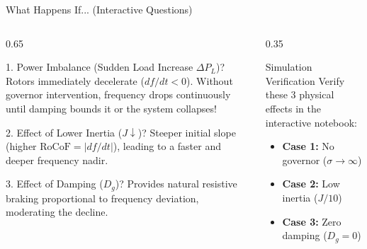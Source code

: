 \begin{frame}{What Happens If... (Interactive Questions)}
\begin{columns}[T]
\begin{column}{0.65\textwidth}
    \footnotesize
    \begin{block}{1. Power Imbalance (Sudden Load Increase $\Delta P_L$)?}
    \scriptsize
    Rotors immediately decelerate ($df/dt < 0$). Without governor intervention, frequency drops continuously until damping bounds it or the system collapses!
    \end{block}
    \begin{block}{2. Effect of Lower Inertia ($J \downarrow$)?}
    \scriptsize
    Steeper initial slope (higher $\mathrm{RoCoF} = |df/dt|$), leading to a faster and deeper frequency nadir.
    \end{block}
    \begin{block}{3. Effect of Damping ($D_g$)?}
    \scriptsize
    Provides natural resistive braking proportional to frequency deviation, moderating the decline.
    \end{block}
\end{column}
\begin{column}{0.35\textwidth}
    \begin{block}{Simulation Verification}
    \scriptsize
    Verify these 3 physical effects in the interactive notebook:
    \vspace{0.2cm}
    
    \href{https://github.com/bcornelusse/ELEC0447-analysis-power-systems/blob/master/Lectures/frequency_control/frequency_control_simulation.ipynb}{}
    \vspace{0.15cm}
    
    \tiny
    \begin{itemize}\setlength{\itemsep}{2pt}
        \item \textbf{Case 1:} No governor ($\sigma \to \infty$)
        \item \textbf{Case 2:} Low inertia ($J/10$)
        \item \textbf{Case 3:} Zero damping ($D_g = 0$)
    \end{itemize}
    \end{block}
\end{column}
\end{columns}
\end{frame}

